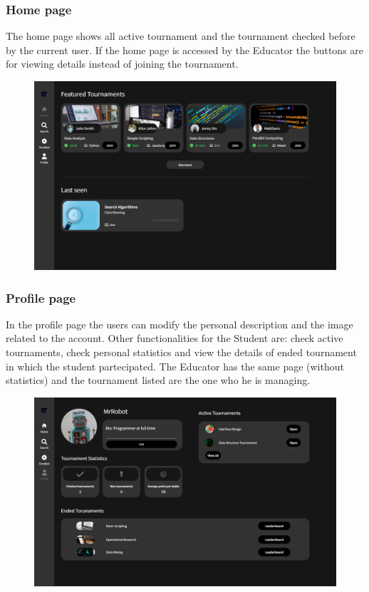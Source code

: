 \documentclass[12pt, a4paper]{report}
\begin{document}
        \subsubsection{Home page} 
        The home page shows all active tournament and the tournament checked before by the current user. 
        If the home page is accessed by the Educator the buttons are for viewing details instead of joining the tournament. 
        \begin{figure}[H]
            \centering
            \includegraphics[width=0.8\linewidth]{images/home.png}
        \end{figure}

        \subsubsection{Profile page} 
        In the profile page the users can modify the personal description and the image related to the account. 
        Other functionalities for the Student are: check active tournaments, check personal statistics and view the details of ended tournament in which the student partecipated.
        The Educator has the same page (without statistics) and the tournament listed are the one who he is managing. 
        \begin{figure}[H]
            \centering
            \includegraphics[width=0.8\linewidth]{images/profilepage.png}
        \end{figure}
\end{document}
